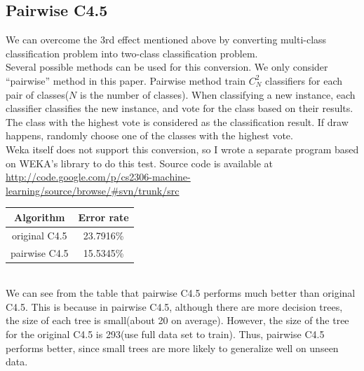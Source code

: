 \documentclass[a4paper,11pt]{article}
\begin{document}
\subsection{Pairwise C4.5}
We can overcome the 3rd effect mentioned above by converting multi-class classification problem into two-class classification problem.\\
Several possible methods can be used for this conversion. We only consider ``pairwise'' method in this paper. Pairwise method train $C_N^2$ classifiers for each pair of classes($N$ is the number of classes). When classifying a new instance, each classifier classifies the new instance, and vote for the class based on their results. The class with the highest vote is considered as the classification result. If draw happens, randomly choose one of the classes with the highest vote.\\
Weka itself does not support this conversion, so I wrote a separate program based on WEKA's library to do this test.
Source code is available at \url{http://code.google.com/p/cs2306-machine-learning/source/browse/#svn/trunk/src}\\
\vspace{0.5cm}
\begin{tabular}{c c}
Algorithm	& Error rate\\
\hline \hline
original C4.5	& 23.7916\%\\
pairwise C4.5	& 15.5345\%\\
\end{tabular}
\vspace{0.5cm}\\
We can see from the table that pairwise C4.5 performs much better than original C4.5. This is because in pairwise C4.5, although there are more decision trees, the size of each tree is small(about 20 on average). However, the size of the tree for the original C4.5 is 293(use full data set to train). Thus, pairwise C4.5 performs better, since small trees are more likely to generalize well on unseen data.
\end{document}

